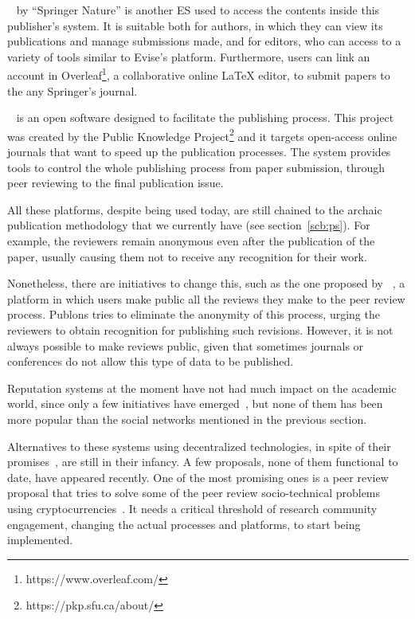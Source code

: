 ~\cite{myspringer} by ``Springer Nature'' is another ES used to
access the contents inside this publisher's system. It is suitable both for
authors, in which they can view its publications and manage submissions made,
and for editors, who can access to a variety of tools similar to Evise's
platform. Furthermore, users can link an account in
Overleaf\footnote{https://www.overleaf.com/}, a collaborative online \LaTeX
editor, to submit papers to the any Springer's journal.

~\cite{willinsky2005open} is an open software designed
to facilitate the publishing process. This project was created by the Public
Knowledge Project\footnote{https://pkp.sfu.ca/about/} and it targets open-access
online journals that want to speed up the publication processes. The system
provides tools to control the whole publishing process from paper submission,
through peer reviewing to the final publication issue.

All these platforms, despite being used today, are still chained to the archaic
publication methodology that we currently have (see section~\ref{scb:ps}). For
example, the reviewers remain anonymous even after the publication of the paper,
usually causing them not to receive any recognition for their work.

Nonetheless, there are initiatives to change this, such as the one proposed by
~\cite{rajpert2016rewarding}, a platform in which users make public
all the reviews they make to the peer review process. Publons tries to eliminate
the anonymity of this process, urging the reviewers to obtain recognition for
publishing such revisions. However, it is not always possible to make reviews
public, given that sometimes journals or conferences do not allow this type of
data to be published.

Reputation systems at the moment have not had much impact on the academic world,
since only a few initiatives have emerged~\cite{sabaterpeer}, but none of them
has been more popular than the social networks mentioned in the previous
section.

Alternatives to these systems using decentralized technologies, in spite of
their promises~\cite{bartlingblockchain}, are still in their infancy. A few
proposals, none of them functional to date, have appeared recently. One of the
most promising ones is a peer review proposal that tries to solve some of the
peer review socio-technical problems using
cryptocurrencies~\cite{tennant2017multi}. It needs a critical threshold of
research community engagement, changing the actual processes and platforms, to
start being implemented.

